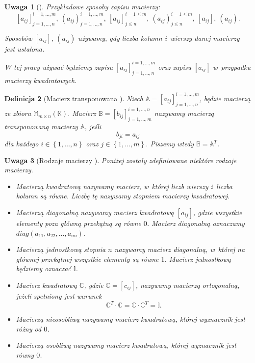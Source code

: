 \documentclass[12pt,a4paper]{report}
\newtheorem{df}{Definicja}[chapter]
\newtheorem{uwaga}[df]{Uwaga}
\newcommand{\set}[1]{\left\lbrace {#1} \right\rbrace}
\newcommand{\setK}{\mathbb{K}}
\begin{document}
\begin{uwaga}[{\citep[Sec 8.1]{alzega}}]
Przykładowe sposoby zapisu macierzy:
$$
[a_{ij}]_{j = 1, \ldots, n}^{i = 1, \ldots , m}, \: (a_{ij})_{j = 1, \ldots, n}^{i = 1, \ldots , m}, \: [a_{ij}]_{j \leq n}^{i = 1 \leq m}, \: (a_{ij})_{j \leq n}^{i = 1 \leq m}, \: [a_{ij}], \: (a_{ij}).
$$

Sposobów $[a_{ij}], \: (a_{ij})$ używamy, gdy liczba kolumn i~wierszy danej macierzy jest ustalona. 

W tej pracy używać będziemy zapisu $[a_{ij}]_{j = 1, \ldots, n}^{i = 1, \ldots , m}$ oraz zapisu $[a_{ij}]$ w~przypadku macierzy kwadratowych.
\end{uwaga}

\begin{df}[Macierz transponowana {\citep[Sec 8.1 ]{alzega}}]
Niech $\mathbb{A} = [a_{ij}]_{j = 1, \ldots, n}^{i = 1, \ldots , m}$, będzie macierzą ze zbioru $\mathbb{M}_{m \times n}(\setK)$.
Macierz $\mathbb{B} = [b_{ij}]_{j = 1, \ldots, m}^{i = 1, \ldots , n}$ nazywamy macierzą transponowaną macierzy $\mathbb{A}$, jeśli 
$$
b_{ji} = a_{ij}
$$ 
dla każdego $i \in \set{1, \ldots, n}$ oraz $j \in \set{1, \ldots ,m}$. Piszemy wtedy $\mathbb{B} = \mathbb{A}^T$.
\end{df}

\begin{uwaga}[Rodzaje macierzy {\citep[Sec 8.1, Sec 10.4]{alzega}}]
Poniżej zostały zdefiniowane niektóre rodzaje macierzy.
\begin{itemize}
\item Macierzą kwadratową nazywamy macierz, w~której liczb wierszy i~liczba kolumn są równe. Liczbę tę nazywamy stopniem macierzy kwadratowej.
\item Macierzą diagonalną nazywamy macierz kwadratową $[a_{ij}]$, gdzie wszystkie elementy poza główną przekątną są równe $0$. Macierz diagonalną oznaczamy 
\\$diag(a_{11}, a_{22}, \ldots , a_{nn})$.
\item Macierzą jednostkową stopnia $n$ nazywamy macierz diagonalną, w~której na głównej przekątnej wszystkie elementy są równe $1$. Macierz jednostkową będziemy oznaczać $\mathbb{I}$.
\item Macierz kwadratową $\mathbb{C}$, gdzie $\mathbb{C} = [c_{ij}]$, nazywamy macierzą ortogonalną, jeżeli spełniony jest warunek
$$
\mathbb{C}^T \cdot \mathbb{C} = \mathbb{C} \cdot \mathbb{C}^T = \mathbb{I}. 
$$
\item Macierzą nieosobliwą nazywamy macierz kwadratową, której wyznacznik jest różny od $0$.
\item Macierzą osobliwą nazywamy macierz kwadratową, której wyznacznik jest równy $0$.
\end{itemize}
\end{uwaga}
\end{document}
